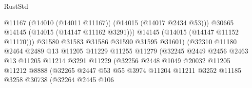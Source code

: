 \begin{lexlean}{RustStd}
\begin{coremodule}
                                            @11167
                                            (@14010 (@14011 @11167))
                                            (@14015 (@14017 @2434 @53)))
                                          @30665
                                          @14145
                                          (@14015 (@14147 @11162 @3291)))
                                        @14145
                                        (@14015 (@14147 @11152 @11170)))
                                      @31580
                                      @31583
                                      @31586
                                      @31590
                                      @31595
                                      @31601)
                                    (@32310
                                      @11180
                                      @2464
                                      @2489
                                      @13
                                      @11205
                                      @11229
                                      @11255
                                      @11279
                                      (@32245
                                        @2449
                                        @2456
                                        @2463
                                        @13
                                        @11205
                                        @11214
                                        @3291
                                        @11229
                                        (@32256
                                          @2448
                                          @1049
                                          @20032
                                          @11205
                                          @11212
                                          @8888
                                          (@32265
                                            @2447
                                            @53
                                            @55
                                            @3974
                                            @11204
                                            @11211
                                            @3252
                                            @11185
                                            @3258
                                            @30738
                                            (@32264
                                              @2445
                                              @106

\end{coremodule}
\end{lexlean}
